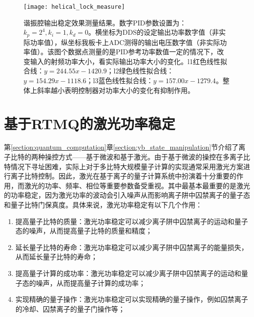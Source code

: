 \begin{figure}
    \centering
    \caption[谐振腔输出稳定效果测量结果]{谐振腔输出稳定效果测量结果。数字PID参数设置为：$k_p=2^4,k_i=1,k_d=0$。横坐标为DDS的设定输出功率数字值（非实际功率值），纵坐标我板卡上ADC测得的输出电压数字值（非实际功率值）。该图个数据点测量的是PID参考功率数值一定的情况下，改变输入的射频功率大小，看实际输出功率大小的变化。l1红色线性拟合线：$y=244.55x-1420.9$；l2绿色线性拟合线：$y=154.29x-1118.6$；l3蓝色线性拟合线：$y=157.00x-1279.4$。整体上斜率越小表明控制器对功率大小的变化有抑制作用。\label{fig:helical_lock_measure}}
    \texttt{[image: helical\_lock\_measure]}
\end{figure}










\newpage
\section[基于RTMQ的激光功率稳定]{基于RTMQ的激光功率稳定\label{section:laser_power_locking}}
第\ref{section:quantum_computation}章\ref{section:yb_state_manipulation}节介绍了离子比特的两种操控方式——基于微波和基于激光。由于基于微波的操控在多离子比特情况下寻址困难，实际上对于多比特大规模量子计算的实现通常采用激光方案进行离子比特控制。因此，激光在基于离子的量子计算系统中扮演着十分重要的作用，而激光的功率、频率、相位等重要参数备受重视。其中最基本最重要的是激光的功率稳定，因为激光功率的波动会引入噪声从而影响离子阱中囚禁离子的量子态和量子比特门保真度\cite[]{Blums_Scarabel_Shimizu_Ghadimi_Connell_Händel_Norton_Bridge_Kielpinski_Lobino_et_al_2020}。具体来说，激光功率稳定有以下几个作用：
\begin{enumerate}
    \item 提高量子比特的质量：激光功率稳定可以减少离子阱中囚禁离子的运动和量子态的噪声，从而提高量子比特的质量和精度；
    \item 延长量子比特的寿命：激光功率稳定可以减少离子阱中囚禁离子的能量损失，从而延长量子比特的寿命；
    \item 提高量子计算的成功率：激光功率稳定可以减少离子阱中囚禁离子的运动和量子态的噪声，从而提高量子计算的成功率；
    \item 实现精确的量子操作：激光功率稳定可以实现精确的量子操作，例如囚禁离子的冷却、囚禁离子的量子门操作等；
\end{enumerate}

